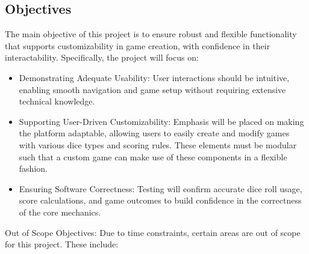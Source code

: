 \documentclass[12pt, titlepage]{article}
\begin{document}
\subsection{Objectives}

\iffalse
\wss{State what is intended to be accomplished.  The objective will be around
  the qualities that are most important for your project.  You might have
  something like: ``build confidence in the software correctness,''
  ``demonstrate adequate usability.'' etc.  You won't list all of the qualities,
  just those that are most important.}

\wss{You should also list the objectives that are out of scope.  You don't have 
the resources to do everything, so what will you be leaving out.  For instance, 
if you are not going to verify the quality of usability, state this.  It is also 
worthwhile to justify why the objectives are left out.}

\wss{The objectives are important because they highlight that you are aware of 
limitations in your resources for verification and validation.  You can't do everything, 
so what are you going to prioritize?  As an example, if your system depends on an 
external library, you can explicitly state that you will assume that external library 
has already been verified by its implementation team.}
\fi

The main objective of this project is to ensure robust and flexible functionality that supports customizability in game creation, with confidence in their interactability. Specifically, the project will focus on:

\begin{itemize}
	\item Demonstrating Adequate Usability: User interactions should be intuitive, enabling smooth navigation and game setup without requiring extensive technical knowledge.
	\item Supporting User-Driven Customizability: Emphasis will be placed on making the platform adaptable, allowing users to easily create and modify games with various dice types and scoring rules. These elements must be modular such that a custom game can make use of these components in a flexible fashion.
	\item Ensuring Software Correctness: Testing will confirm accurate dice roll usage, score calculations, and game outcomes to build confidence in the correctness of the core mechanics.
\end{itemize}

Out of Scope Objectives: Due to time constraints, certain areas are out of scope for this project. These include:
\end{document}
